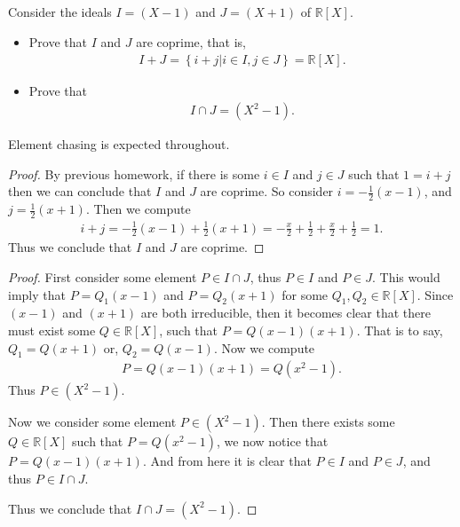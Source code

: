 \documentclass[10pt]{armath}
\newcommand{\R}{\mathbb{R}}
\newenvironment{claim}[1]{\par\noindent\textit{Claim:}\space#1}{}
\begin{document}
\subsection{}%
\label{sub:3b}

Consider the ideals $I=(X-1)$ and $J=(X+1)$ of $\R[X]$.
\begin{itemize}
  \item Prove that $I$ and $J$ are coprime, that is,
    \begin{align*}
      I+J=\left\{i+j\vert i\in I,j\in J\right\}=\R[X].
    \end{align*}
  \item Prove that
    \begin{align*}
      I\cap J=(X^2-1).
    \end{align*}
\end{itemize}
Element chasing is expected throughout.

\begin{proof}
  By previous homework, if there is some $i\in I$ and $j\in J$ such that
  $1=i+j$ then we can conclude that $I$ and $J$ are coprime. So consider
  $i=-\frac{1}{2}(x-1)$, and $j=\frac{1}{2}(x+1)$. Then we compute
  \begin{align*}
    i+j=-\frac{1}{2}(x-1)+\frac{1}{2}(x+1)=-\frac{x}{2}+\frac{1}{2}+\frac{x}{2}+\frac{1}{2}=1.
  \end{align*}
  Thus we conclude that $I$ and $J$ are coprime.
\end{proof}

\begin{proof}
   First consider some element $P\in I\cap J$, thus $P\in I$ and $P\in J$. This
   would imply that $P=Q_1(x-1)$ and $P=Q_2(x+1)$ for some $Q_1,Q_2\in\R[X]$.
   Since $(x-1)$ and $(x+1)$ are both irreducible, then it becomes clear that
   there must exist some $Q\in\R[X]$, such that $P=Q(x-1)(x+1)$. That is to
   say, $Q_1=Q(x+1)$ or, $Q_2=Q(x-1)$. Now we compute
   \begin{align*}
      P=Q(x-1)(x+1)=Q(x^2-1).
   \end{align*}
   Thus $P\in\left(X^2-1\right)$.

   Now we consider some element $P\in\left(X^2-1\right)$. Then there exists
   some $Q\in\R[X]$ such that $P=Q(x^2-1)$, we now notice that $P=Q(x-1)(x+1)$.
   And from here it is clear that $P\in I$ and $P\in J$, and thus $P\in I\cap
   J$.

   Thus we conclude that $I\cap J=\left(X^2-1\right)$.
\end{proof}
\end{document}
